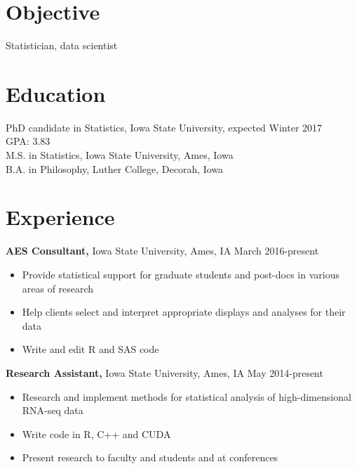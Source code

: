 \documentclass[margin]{res}
\begin{document}
 
 
 
\address{mathteacher.mittman@gmail.com \\
emittman.github.io\\1422 Maxwell Avenue, Ames, IA 50010\\ (319) 283-0568}

 
\begin{resume} 
 
\section{Objective} 
Statistician, data scientist

\section{Education}
PhD candidate in Statistics, Iowa State University, expected Winter 2017\\
GPA: 3.83\\
M.S. in Statistics, Iowa State University, Ames, Iowa\\
B.A. in Philosophy, Luther College, Decorah, Iowa\\


\section{Experience}
 {\bf AES Consultant,} Iowa State University, Ames, IA \hfill March 2016-present
 \begin{itemize} \itemsep -2pt  %
 \item Provide statistical support for graduate students and post-docs in various areas of research
 \item Help clients select and interpret appropriate displays and analyses for their data
 \item Write and edit R and SAS code
 \end{itemize}

 
 
{\bf Research Assistant,} Iowa State University, Ames, IA \hfill May 2014-present
\begin{itemize} \itemsep -2pt %
\item Research and implement methods for statistical analysis of high-dimensional RNA-seq data
\item Write code in R, C++ and CUDA
\item Present research to faculty and students and at conferences
\end{itemize}


\end{resume}
\end{document}

